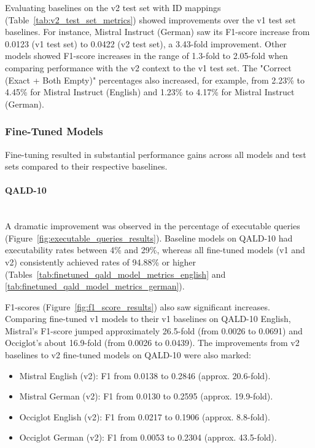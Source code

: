Evaluating baselines on the v2 test set with ID mappings (Table~\ref{tab:v2_test_set_metrics}) showed improvements over the v1 test set baselines. 
For instance, Mistral Instruct (German) saw its F1-score increase from 0.0123 (v1 test set) to 0.0422 (v2 test set), a 3.43-fold improvement.
Other models showed F1-score increases in the range of 1.3-fold to 2.05-fold when comparing performance with the v2 context to the v1 test set.
The "Correct (Exact + Both Empty)" percentages also increased, for example, from 2.23\% to 4.45\% for Mistral Instruct (English) and 1.23\% to 4.17\% for Mistral Instruct (German).

\subsubsection{Fine-Tuned Models}
Fine-tuning resulted in substantial performance gains across all models and test sets compared to their respective baselines.

\paragraph{QALD-10} \mbox{}\\
A dramatic improvement was observed in the percentage of executable queries (Figure~\ref{fig:executable_queries_results}).
Baseline models on QALD-10 had executability rates between 4\% and 29\%, whereas all fine-tuned models (v1 and v2) consistently achieved rates of 94.88\% or higher (Tables~\ref{tab:finetuned_qald_model_metrics_english} and \ref{tab:finetuned_qald_model_metrics_german}).

F1-scores (Figure~\ref{fig:f1_score_results}) also saw significant increases. 
Comparing fine-tuned v1 models to their v1 baselines on QALD-10 English, Mistral's F1-score jumped approximately 26.5-fold (from 0.0026 to 0.0691) and Occiglot's about 16.9-fold (from 0.0026 to 0.0439).
The improvements from v2 baselines to v2 fine-tuned models on QALD-10 were also marked:
\begin{itemize}
    \item Mistral English (v2): F1 from 0.0138 to 0.2846 (approx. 20.6-fold).
    \item Mistral German (v2): F1 from 0.0130 to 0.2595 (approx. 19.9-fold).
    \item Occiglot English (v2): F1 from 0.0217 to 0.1906 (approx. 8.8-fold).
    \item Occiglot German (v2): F1 from 0.0053 to 0.2304 (approx. 43.5-fold).
\end{itemize}

